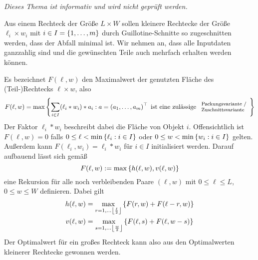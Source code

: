 \begin{center}
	\color{cdgray} \fosfamily \itshape Dieses Thema ist informativ und wird nicht geprüft werden.
\end{center}

Aus einem Rechteck der Größe $L \times W$ sollen kleinere Rechtecke der Größe $\ell_i \times w_i$ mit $i \in I = \left\{ 1, \dots, m \right\}$ durch Guillotine-Schnitte so zugeschnitten werden, dass der Abfall minimal ist. Wir nehmen an, dass alle Inputdaten ganzzahlig sind und die gewünschten Teile auch mehrfach erhalten werden können.

\begin{center}
	\hspace{4em}
\end{center}

Es bezeichnet $F(\ell, w)$ den Maximalwert der genutzten Fläche des (Teil-)Rechtecks $\ell \times w$, also
\begin{equation*}
	F(\ell, w) = \max\left\{ \sum_{i \in I} (\ell_i * w_i) * a_i : a = \left( a_1, \dots, a_m \right)^{\top} \text{ ist eine zulässige }
		\footnotesize \begin{array}{l}
			\text{Packungsvariante /} \\
			\text{Zuschnittsvariante}
		\end{array}
		 \right\}
\end{equation*}
Der Faktor $\ell_i * w_i$ beschreibt dabei die Fläche von Objekt $i$.
Offensichtlich ist $F(\ell, w) = 0$ falls $0 \le \ell < \min\left\{ \ell_i : i \in I \right\}$ oder $0 \le w < \min\left\{ w_i : i \in I \right\}$ gelten. Außerdem kann $F(\ell_i, w_i) = \ell_i * w_i$ für $i \in I$ initialisiert werden. Darauf aufbauend lässt sich gemäß
\begin{equation*}
	F(\ell,w) \mathrel{:=} \max\left\{ h(\ell,w), v(\ell, w) \right\}
\end{equation*}
eine Rekursion für alle noch verbleibenden Paare $(\ell,w)$ mit $0 \le \ell \le L$, $0 \le w \le W$ definieren. Dabei gilt
\begin{equation*}
	\begin{aligned}
	h(\ell,w) &= \max_{r=1, \dots \left\lfloor \frac{\ell}{2} \right\rfloor} \left\{ F(r,w) + F(\ell-r, w) \right\} \\
	v(\ell, w) &= \max_{s=1, \dots \left\lfloor \frac{w}{2} \right\rfloor} \left\{ F(\ell,s) + F(\ell, w-s) \right\}
	\end{aligned}
\end{equation*}
Der Optimalwert für ein großes Rechteck kann also aus den Optimalwerten kleinerer Rechtecke gewonnen werden.